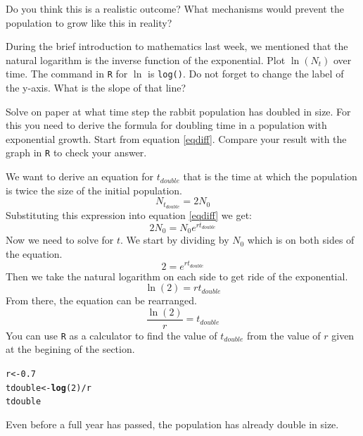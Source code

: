 \documentclass{article}\usepackage[]{graphicx}\usepackage[]{color}
\makeatletter
\newcommand{\hlnum}[1]{\textcolor[rgb]{0.686,0.059,0.569}{#1}}%
\newcommand{\hlopt}[1]{\textcolor[rgb]{0,0,0}{#1}}%
\newcommand{\hlstd}[1]{\textcolor[rgb]{0.345,0.345,0.345}{#1}}%
\newcommand{\hlkwb}[1]{\textcolor[rgb]{0.69,0.353,0.396}{#1}}%
\newcommand{\hlkwd}[1]{\textcolor[rgb]{0.737,0.353,0.396}{\textbf{#1}}}%
\newenvironment{kframe}{%
 \def\at@end@of@kframe{}%
 \ifinner\ifhmode%
  \def\at@end@of@kframe{\end{minipage}}%
  \begin{minipage}{\columnwidth}%
 \fi\fi%
 \def\FrameCommand##1{\hskip\@totalleftmargin \hskip-\fboxsep
 \colorbox{shadecolor}{##1}\hskip-\fboxsep
     \hskip-\linewidth \hskip-\@totalleftmargin \hskip\columnwidth}%
 \MakeFramed {\advance\hsize-\width
   \@totalleftmargin\z@ \linewidth\hsize
   \@setminipage}}%
 {\par\unskip\endMakeFramed%
 \at@end@of@kframe}
\newenvironment{knitrout}{}{} %
\makeatother
\begin{document}
Do you think this is a realistic outcome? What mechanisms would prevent the population to grow like this in reality?


During the brief introduction to mathematics last week, we mentioned that the natural logarithm is the inverse function of the exponential. Plot $\ln(N_t)$ over time. The command in \texttt{R} for $\ln$ is \texttt{log()}. Do not forget to change the label of the y-axis. What is the slope of that line?
\begin{Exercise}[title=doubling time, label=dt, difficulty=2]
Solve on paper at what time step the rabbit population has doubled in size. For this you need to derive the formula for doubling time in a population with exponential growth. Start from equation \ref{eqdiff}. Compare your result with the graph in \texttt{R} to check your answer.
\end{Exercise}
\begin{Answer}[ref=dt]
We want to derive an equation for $t_{double}$ that is the time at which the population is twice the size of the initial population.
\begin{equation}
N_{t_{double}}=2N_0
\end{equation}
Substituting this expression into equation \ref{eqdiff} we get:
\begin{equation*}
2N_0=N_0e^{rt_{double}}
\end{equation*}
Now we need to solve for $t$. We start by dividing by $N_0$ which is on both sides of the equation.
\begin{equation*}
2=e^{rt_{double}}
\end{equation*}
Then we take the natural logarithm on each side to get ride of the exponential. 
\begin{equation*}
\ln(2)=rt_{double}
\end{equation*}
From there, the equation can be rearranged.
\begin{equation*}
\frac{\ln(2)}{r}=t_{double}
\end{equation*}
You can use \texttt{R} as a calculator to find the value of $t_{double}$ from the value of $r$ given at the begining of the section.
\begin{knitrout}
\color{fgcolor}\begin{kframe}
\begin{alltt}
\hlstd{r}\hlkwb{<-} \hlnum{0.7}
\hlstd{tdouble}\hlkwb{<-}\hlkwd{log}\hlstd{(}\hlnum{2}\hlstd{)}\hlopt{/}\hlstd{r}
\hlstd{tdouble}
\end{alltt}
\end{kframe}
\end{knitrout}
Even before a full year has passed, the population has already double in size.
\end{Answer}
\end{document}
